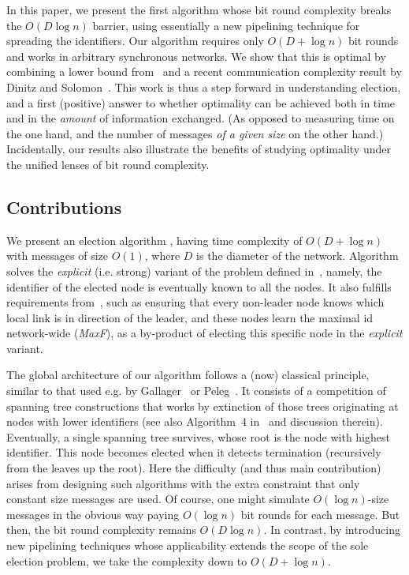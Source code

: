 \documentclass[11pt,envcountsame,letterpaper]{llncs}
\begin{document}
In this paper, we present the first algorithm whose bit round complexity breaks the $O(D\log n)$ barrier, using essentially a new pipelining technique for spreading the identifiers. Our algorithm requires only $O(D + \log n)$ bit rounds and works in arbitrary synchronous networks. We show that this is optimal by combining a lower bound from~\cite{KPPRT15} and a recent communication complexity result by Dinitz and Solomon~\cite{DS07}.
This work is thus a step forward in understanding election, and a first (positive) answer to whether optimality can be
achieved
both in time and in the {\em amount} of information exchanged. (As opposed to measuring time on the one hand, and the number of messages {\em of a given size} on the other hand.) Incidentally, our results also
illustrate
the benefits of studying optimality under the unified lenses of bit round complexity.


\subsection{Contributions}

We present an election algorithm \STT, having time complexity of $O(D+\log n)$ with messages of size $O(1)$, where $D$ is the diameter of the network.
Algorithm \STT solves the {\em explicit} (i.e. strong) variant of the problem defined in~\cite{KPPRT15}, namely, the identifier of the elected node is eventually known to all the nodes. It also fulfills requirements from~\cite{DS07}, such as ensuring that every non-leader node knows which local link is in direction of the leader, and these nodes learn the maximal id network-wide ({\em MaxF}), as a by-product of electing this specific node in the {\em explicit} variant.

The global architecture of our algorithm follows a (now) classical principle, similar to that used e.g. by Gallager~\cite{Gallager} or Peleg~\cite{Peleg90}. It consists of a competition of spanning tree constructions that works by extinction of those trees originating at nodes with lower identifiers (see also Algorithm~4 in~\cite{Attiya} and discussion therein). Eventually, a single spanning tree survives, whose root is the node with highest identifier. This node becomes elected when it detects termination (recursively from the leaves up the root). Here the difficulty (and thus main contribution) arises from designing such algorithms with the extra constraint that only constant size messages are used. Of course, one might simulate $O(\log n)$-size messages in the obvious way paying $O(\log n)$ bit rounds for each message. But then, the bit round complexity remains $O(D \log n)$. In contrast, by introducing new pipelining techniques whose applicability extends the scope of the sole election problem, we take the complexity down to $O(D + \log n)$.
\end{document}
